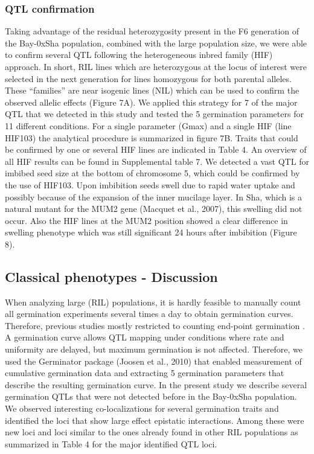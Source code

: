 \documentclass[8pt, twoside, a5paper]{report}
\begin{document}
\subsubsection{QTL confirmation}
Taking advantage of the residual heterozygosity present in the F6 generation of the Bay-0xSha population, combined with the large population size, 
we were able to confirm several QTL following the heterogeneous inbred family (HIF) approach. In short, RIL lines which are heterozygous at the 
locus of interest were selected in the next generation for lines homozygous for both parental alleles. These “families” are near isogenic lines 
(NIL) which can be used to confirm the observed allelic effects (Figure 7A). We applied this strategy for 7 of the major QTL that we detected in 
this study and tested the 5 germination parameters for 11 different conditions. For a single parameter (Gmax) and a single HIF (line HIF103) the 
analytical procedure is summarized in figure 7B. Traits that could be confirmed by one or several HIF lines are indicated in Table 4. An overview
of all HIF results can be found in Supplemental table 7. We detected a vast QTL for imbibed seed size at the bottom of chromosome 5, which could 
be confirmed by the use of HIF103. Upon imbibition seeds swell due to rapid water uptake and possibly because of the expansion of the inner 
mucilage layer. In Sha, which is a natural mutant for the MUM2 gene (Macquet et al., 2007), this swelling did not occur. Also the HIF lines at the
MUM2 position showed a clear difference in swelling phenotype which was still significant 24 hours after imbibition (Figure 8).

\subsection{Classical phenotypes - Discussion}
When analyzing large (RIL) populations, it is hardly feasible to manually count all germination experiments several times a day to obtain germination curves. Therefore,
previous studies mostly restricted to counting end-point germination \cite{Quesada:2002, Alonso-Blanco:2003, Clerkx:2004, Laserna:2008, Meng:2008, Bentsink:2010, Galpaz:2010, Vallejo:2010}. 
A germination curve allows QTL mapping under conditions where rate and uniformity are
delayed, but maximum germination is not affected. Therefore, we used the Germinator package (Joosen et al., 2010) that enabled measurement of cumulative germination data
and extracting 5 germination parameters that describe the resulting germination curve. In the present study we describe several germination QTLs that were not detected before in
the Bay-0xSha population. We observed interesting co-localizations for several germination traits and identified the loci that show large effect epistatic interactions.
Among these were new loci and loci similar to the ones already found in other RIL populations as summarized in Table 4 for the major identified QTL loci.
\end{document}
